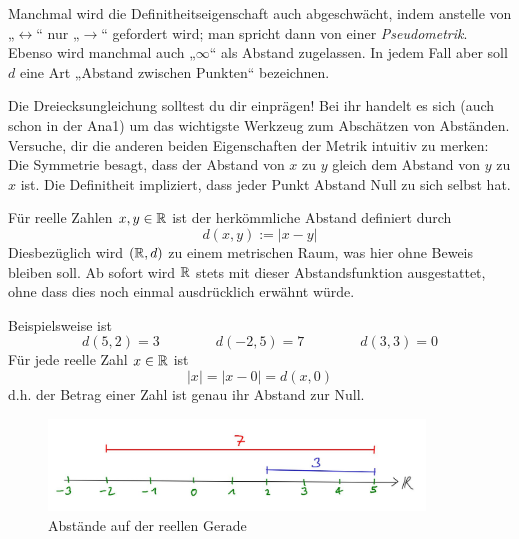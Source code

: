 \begin{bem}
    Manchmal wird die Definitheitseigenschaft auch abgeschwächt, indem anstelle von „$\leftrightarrow$“ nur „$\rightarrow$“ gefordert wird; man spricht dann von einer \emph{Pseudometrik}. Ebenso wird manchmal auch „$\infty$“ als Abstand zugelassen. In jedem Fall aber soll $d$ eine Art „Abstand zwischen Punkten“ bezeichnen.
    
    Die Dreiecksungleichung solltest du dir einprägen! Bei ihr handelt es sich (auch schon in der Ana1) um das wichtigste Werkzeug zum Abschätzen von Abständen. Versuche, dir die anderen beiden Eigenschaften der Metrik intuitiv zu merken: Die Symmetrie besagt, dass der Abstand von $x$ zu $y$ gleich dem Abstand von $y$ zu $x$ ist. Die Definitheit impliziert, dass jeder Punkt Abstand Null zu sich selbst hat.
\end{bem}


\begin{defin}[Abstand in $\R$]
    Für reelle Zahlen $x,y\in \mathbb R$ ist der herkömmliche Abstand definiert durch
        \[ d(x,y) := \vert x -y\vert \]
    Diesbezüglich wird $(\mathbb R,d)$ zu einem metrischen Raum, was hier ohne Beweis bleiben soll. %
    Ab sofort wird $\R$ stets mit dieser Abstandsfunktion ausgestattet, ohne dass dies noch einmal ausdrücklich erwähnt würde.
\end{defin}


\begin{bsp}
    Beispielsweise ist
        \[ d(5,2)= 3 \qquad\qquad d(-2,5)=7 \qquad\qquad d(3,3)=0 \]
    Für jede reelle Zahl $x\in \mathbb R$ ist
        \[ \vert x\vert = \vert x-0\vert = d(x,0) \]
    d.h. der Betrag einer Zahl ist genau ihr Abstand zur Null. 
    \begin{figure}[ht]
        \includegraphics[width=10cm]{./_img/Abstand.jpeg}
        \centering \caption{Abstände auf der reellen Gerade}
    \end{figure}
\end{bsp}


